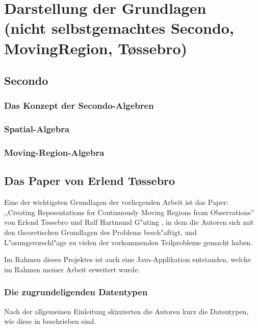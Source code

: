
\chapter[Darstellung der Grundlagen \anmerkung{30-40 Seiten}]{Darstellung der Grundlagen\\
\normalsize{(nicht selbstgemachtes
Secondo,
MovingRegion,
T\o{}ssebro)}} \label{Kapitel2}
\minitoc
\newpage
\section{Secondo }\label{SecondoEinfuehrung}
\subsection{Das Konzept der Secondo-Algebren}
\subsection{Spatial-Algebra}
\subsection{Moving-Region-Algebra}

\section{Das Paper von Erlend T\o{}ssebro }\label{Tossebro}

Eine der wichtigsten Grundlagen der vorliegenden Arbeit ist das Paper: ,,Creating Repesentations for Continuously Moving Regions from Observations'' \cite{TG} von Erlend T\o{}ssebro und Ralf Hartmund G"uting \cite{TG}, in dem die Autoren sich mit den theoretischen Grundlagen des Problems besch"aftigt, und L"osungsvorschl"age zu vielen der vorkommenden Teilprobleme gemacht haben.

Im Rahmen dieses Projektes ist auch eine Java-Applikation entstanden, welche im Rahmen meiner Arbeit erweitert wurde.

\subsection{Die zugrundeligenden Datentypen}
Nach der allgemeinen Einleitung skizzierten die Autoren kurz die Datentypen, wie diese in \cite{FGNS} beschrieben sind.

